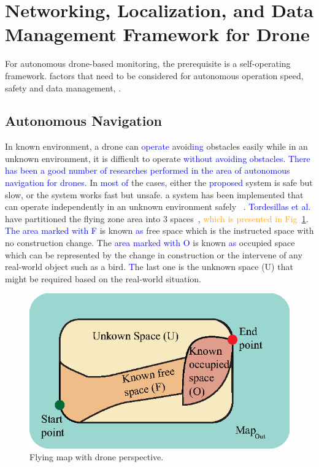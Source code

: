 \section{Networking, Localization, and Data Management Framework for Drone}
\label{networkingsection}

For autonomous drone-based monitoring, the prerequisite is a self-operating framework.
factors that need to be considered for autonomous operation  speed, safety and data management, .

\subsection{Autonomous Navigation}
In  known environment, a drone can \textcolor{blue}{operate} avoid\textcolor{blue}{ing} obstacles easily while in an unknown environment, it is difficult to operate \textcolor{blue}{without avoiding obstacles. There has been a good number of researches performed in the area of autonomous navigation for drones}. In \textcolor{blue}{most of} the  case\textcolor{blue}{s}, either the \textcolor{blue}{proposed} system is safe but slow, or the system works fast but unsafe.  a system has been implemented that can operate independently in an unknown environment safely ~\cite{tordesillas2019real}. 
\textcolor{blue}{Tordesillas et al.} have partitioned the flying zone area into 3 spaces~\cite{tordesillas2019faster}, \textcolor{orange}{which is presented in Fig~\ref{autonomous}}.
\textcolor{blue}{The area marked with F}  is known \textcolor{blue}{as} free space which is the instructed space with no construction change. The \textcolor{blue} {area marked with O}  is known \textcolor{blue}{as} occupied space  which can be represented by the change in construction or the intervene of any real-world object such as a bird. \textcolor{blue}{T}he last one is the unknown space (U) that might be required based on the real-world situation.
\begin{figure}[h!]
\centering
\includegraphics[width=.65\linewidth]{figure/autonomous.eps}
\caption{Flying map with drone perspective.}
\label{autonomous}
\end{figure}


